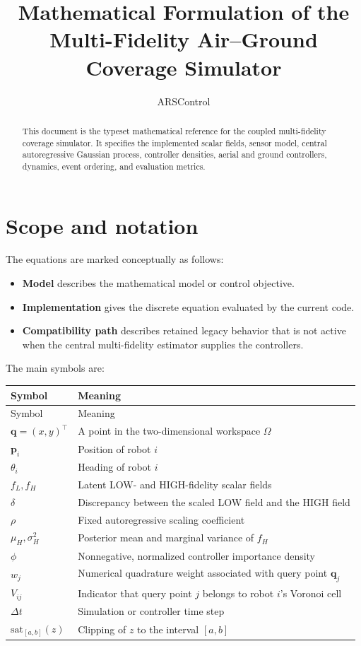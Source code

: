 \documentclass[11pt]{article}
\title{Mathematical Formulation of the Multi-Fidelity Air--Ground Coverage Simulator}
\author{ARSControl}
\date{}
\begin{document}
\maketitle

\begin{abstract}
This document is the typeset mathematical reference for the coupled multi-fidelity coverage simulator. It specifies the implemented scalar fields, sensor model, central autoregressive Gaussian process, controller densities, aerial and ground controllers, dynamics, event ordering, and evaluation metrics.
\end{abstract}

\section{Scope and notation}


The equations are marked conceptually as follows:


\begin{itemize}
\item \textbf{Model} describes the mathematical model or control objective.
\item \textbf{Implementation} gives the discrete equation evaluated by the current code.
\item \textbf{Compatibility path} describes retained legacy behavior that is not active when the central multi-fidelity estimator supplies the controllers.
\end{itemize}


The main symbols are:


\begin{longtable}{p{} p{}}
\toprule
Symbol & Meaning \\
\midrule
\endfirsthead
\toprule
Symbol & Meaning \\
\midrule
\endhead
$\mathbf q=(x,y)^\top$ & A point in the two-dimensional workspace $\Omega$ \\
$\mathbf p_i$ & Position of robot $i$ \\
$\theta_i$ & Heading of robot $i$ \\
$f_L,f_H$ & Latent LOW- and HIGH-fidelity scalar fields \\
$\delta$ & Discrepancy between the scaled LOW field and the HIGH field \\
$\rho$ & Fixed autoregressive scaling coefficient \\
$\mu_H,\sigma_H^2$ & Posterior mean and marginal variance of $f_H$ \\
$\phi$ & Nonnegative, normalized controller importance density \\
$w_j$ & Numerical quadrature weight associated with query point $\mathbf q_j$ \\
$V_{ij}$ & Indicator that query point $j$ belongs to robot $i$'s Voronoi cell \\
$\Delta t$ & Simulation or controller time step \\
$\mathrm{sat}_{[a,b]}(z)$ & Clipping of $z$ to the interval $[a,b]$ \\
\bottomrule
\end{longtable}
\end{document}
